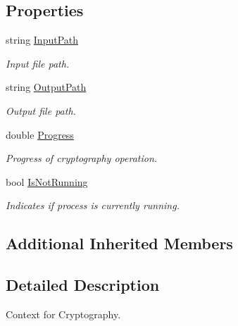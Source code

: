 \subsection*{Properties}
\begin{DoxyCompactItemize}
\item 
string \mbox{\hyperlink{class_b_s_k___encryption_1_1_view_models_1_1_data_view_model_a316ad59c641b9a8032095f33e9c76865}{Input\+Path}}
\begin{DoxyCompactList}\small\item\em Input file path. \end{DoxyCompactList}\item 
string \mbox{\hyperlink{class_b_s_k___encryption_1_1_view_models_1_1_data_view_model_a1c4ad9bddae9ff3eb22e960c639e3382}{Output\+Path}}
\begin{DoxyCompactList}\small\item\em Output file path. \end{DoxyCompactList}\item 
double \mbox{\hyperlink{class_b_s_k___encryption_1_1_view_models_1_1_data_view_model_a3473fbb812cdfe8a23b7f99c2e8db170}{Progress}}
\begin{DoxyCompactList}\small\item\em Progress of cryptography operation. \end{DoxyCompactList}\item 
bool \mbox{\hyperlink{class_b_s_k___encryption_1_1_view_models_1_1_data_view_model_a2569f9d37164893d6201d52788d05742}{Is\+Not\+Running}}
\begin{DoxyCompactList}\small\item\em Indicates if process is currently running. \end{DoxyCompactList}\end{DoxyCompactItemize}
\subsection*{Additional Inherited Members}


\subsection{Detailed Description}
Context for Cryptography. 



